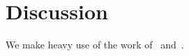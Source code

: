 \chapter{Discussion}\label{chapter:discussion}

\lipsum[2-5] %

We make heavy use of the work of~\cite{mendel1865} and~\cite{morgan1915}.

\lipsum[8-14] %